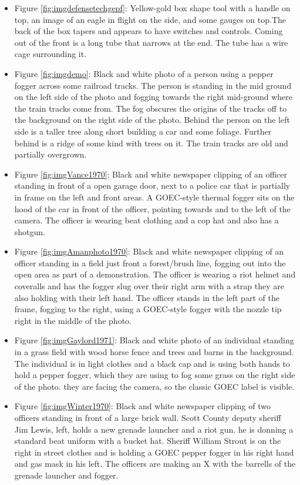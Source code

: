 \documentclass[
  11pt,
]{krantz}
\begin{document}
\begin{itemize}
\item
  Figure \ref{fig:imgdefensetechgepf}: Yellow-gold box shape tool with a handle on top, an image of an eagle in flight on the side, and some gauges on top.The back of the box tapers and appears to have switches and controls. Coming out of the front is a long tube that narrows at the end. The tube has a wire cage surrounding it.
\item
  Figure \ref{fig:imgdemo}: Black and white photo of a person using a pepper fogger across some railroad tracks. The person is standing in the mid ground on the left side of the photo and fogging towards the right mid-ground where the train tracks come from. The fog obscures the origins of the tracks off to the background on the right side of the photo. Behind the person on the left side is a taller tree along short building a car and some foliage. Further behind is a ridge of some kind with trees on it. The train tracks are old and partially overgrown.
\item
  Figure \ref{fig:imgVance1970}: Black and white newspaper clipping of an officer standing in front of a open garage door, next to a police car that is partially in frame on the left and front areas. A GOEC-style thermal fogger sits on the hood of the car in front of the officer, pointing towards and to the left of the camera. The officer is wearing beat clothing and a cop hat and also has a shotgun.
\item
  Figure \ref{fig:imgAmanphoto1970}: Black and white newspaper clipping of an officer standing in a field just front a forest/brush line, fogging out into the open area as part of a demonstration. The officer is wearing a riot helmet and coveralls and has the fogger slug over their right arm with a strap they are also holding with their left hand. The officer stands in the left part of the frame, fogging to the right, using a GOEC-style fogger with the nozzle tip right in the middle of the photo.
\item
  Figure \ref{fig:imgGaylord1971}: Black and white photo of an individual standing in a grass field with wood horse fence and trees and barns in the background. The individual is in light clothes and a black cap and is using both hands to hold a pepper fogger, which they are using to fog some grass on the right side of the photo. they are facing the camera, so the classic GOEC label is visible.
\item
  Figure \ref{fig:imgWinter1970}: Black and white newspaper clipping of two officers standing in front of a large brick wall. Scott County deputy sheriff Jim Lewis, left, holds a new grenade launcher and a riot gun. he is donning a standard beat uniform with a bucket hat. Sheriff William Strout is on the right in street clothes and is holding a GOEC pepper fogger in his right hand and gas mask in his left. The officers are making an X with the barrells of the grenade launcher and fogger.

\end{itemize}
\end{document}
